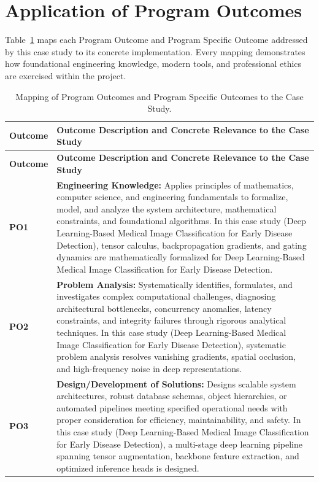 \section{Application of Program Outcomes}
Table~\ref{tab:po} maps each Program Outcome and Program Specific Outcome addressed by this case study to its concrete implementation. Every mapping demonstrates how foundational engineering knowledge, modern tools, and professional ethics are exercised within the project.

{\small
\begin{longtable}{@{}>{\centering\arraybackslash}p{1.8cm} p{13.2cm}@{}}
    \caption{Mapping of Program Outcomes and Program Specific Outcomes to the Case Study.}\label{tab:po}\\
    \toprule
    \textbf{Outcome} & \textbf{Outcome Description and Concrete Relevance to the Case Study} \\
    \midrule
    \endfirsthead
    \toprule
    \textbf{Outcome} & \textbf{Outcome Description and Concrete Relevance to the Case Study} \\
    \midrule
    \endhead
\textbf{PO1} & \textbf{Engineering Knowledge:} Applies principles of mathematics, computer science, and engineering fundamentals to formalize, model, and analyze the system architecture, mathematical constraints, and foundational algorithms. In this case study (Deep Learning-Based Medical Image Classification for Early Disease Detection), tensor calculus, backpropagation gradients, and gating dynamics are mathematically formalized for Deep Learning-Based Medical Image Classification for Early Disease Detection. \\
    \addlinespace
\textbf{PO2} & \textbf{Problem Analysis:} Systematically identifies, formulates, and investigates complex computational challenges, diagnosing architectural bottlenecks, concurrency anomalies, latency constraints, and integrity failures through rigorous analytical techniques. In this case study (Deep Learning-Based Medical Image Classification for Early Disease Detection), systematic problem analysis resolves vanishing gradients, spatial occlusion, and high-frequency noise in deep representations. \\
    \addlinespace
\textbf{PO3} & \textbf{Design/Development of Solutions:} Designs scalable system architectures, robust database schemas, object hierarchies, or automated pipelines meeting specified operational needs with proper consideration for efficiency, maintainability, and safety. In this case study (Deep Learning-Based Medical Image Classification for Early Disease Detection), a multi-stage deep learning pipeline spanning tensor augmentation, backbone feature extraction, and optimized inference heads is designed. \\

\end{longtable}}
